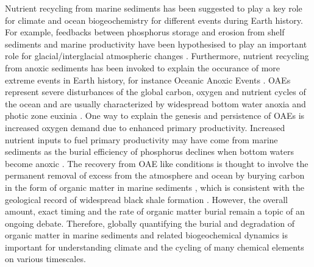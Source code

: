 \documentclass[gmd, manuscript]{copernicus}
\begin{document}


Nutrient recycling from marine sediments has been suggested to play a key role for climate and ocean biogeochemistry for different events during Earth history. 
For example, feedbacks between phosphorus storage and erosion from shelf sediments and marine productivity have been hypothesised to play an important role for glacial/interglacial atmospheric  changes \citep{broecker_ocean_1982, ruttenberg_reassessment_1993}. 
Furthermore, nutrient recycling from anoxic sediments has been invoked to explain the occurance of more extreme events in Earth history, for instance Oceanic Anoxic Events %
\citep[OAEs, e.g.][]{mort_phosphorus_2007, tsandev_modeling_2009}. OAEs represent severe disturbances of the global carbon, oxygen and nutrient cycles of the ocean and are usually characterized 
by widespread bottom water anoxia and photic zone euxinia \citep{jenkyns_geochemistry_2010}. 
One way to explain the genesis and persistence of OAEs is increased oxygen demand due to enhanced primary productivity. Increased nutrient inputs to fuel primary productivity may have come from marine sediments as the 
burial efficiency of phosphorus declines when bottom waters become anoxic \citep{ingall_evidence_1994, van_cappellen_benthic_1994}. 
The recovery from OAE like conditions is thought to involve the permanent removal of excess  from the atmosphere and ocean by burying carbon in the form of organic matter in marine sediments 
\citep[e.g.][]{arthur_geochemical_1988, jarvis_black_2011}, which is consistent with the geological record of widespread black shale formation \citep{stein_accumulation_1986}. 
However, the overall amount, exact timing and the rate of organic matter burial remain a topic of an ongoing debate. 
Therefore, globally quantifying the burial and degradation of organic matter in marine sediments and related biogeochemical dynamics is important for understanding 
climate and the cycling of many chemical elements on various timescales. 
\end{document}

